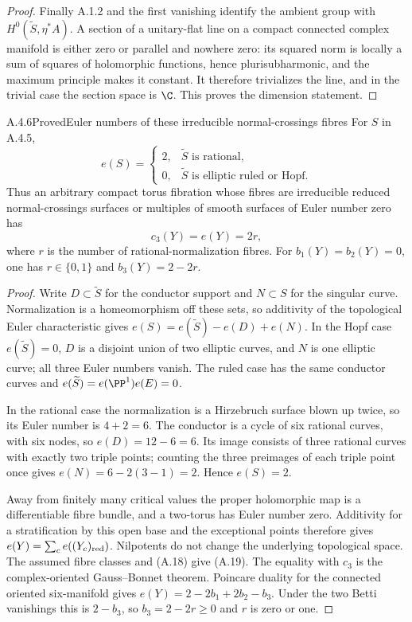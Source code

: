 \begin{proof}
Finally A.1.2 and the first vanishing identify the ambient group with $H^0(\widetilde S,\eta^*A)$. A section of a unitary-flat line on a compact connected complex manifold is either zero or parallel and nowhere zero: its squared norm is locally a sum of squares of holomorphic functions, hence plurisubharmonic, and the maximum principle makes it constant. It therefore trivializes the line, and in the trivial case the section space is $\C$. This proves the dimension statement.
\end{proof}

\begin{statement}{A.4.6}{Proved}{Euler numbers of these irreducible normal-crossings fibres}
For $S$ in A.4.5,
\[
e(S)=\begin{cases}
2,&\widetilde S\text{ is rational},\\
0,&\widetilde S\text{ is elliptic ruled or Hopf}.
\end{cases}
\tag{A.18}
\]
Thus an arbitrary compact torus fibration whose fibres are irreducible reduced normal-crossings surfaces or multiples of smooth surfaces of Euler number zero has
\[
c_3(Y)=e(Y)=2r,
\tag{A.19}
\]
where $r$ is the number of rational-normalization fibres. For $b_1(Y)=b_2(Y)=0$, one has $r\in\{0,1\}$ and $b_3(Y)=2-2r$.
\end{statement}
\begin{proof}
Write $D\subset\widetilde S$ for the conductor support and $N\subset S$ for the singular curve. Normalization is a homeomorphism off these sets, so additivity of the topological Euler characteristic gives $e(S)=e(\widetilde S)-e(D)+e(N)$. In the Hopf case $e(\widetilde S)=0$, $D$ is a disjoint union of two elliptic curves, and $N$ is one elliptic curve; all three Euler numbers vanish. The ruled case has the same conductor curves and $e(\widetilde S)=e(\PP^1)e(E)=0$.

In the rational case the normalization is a Hirzebruch surface blown up twice, so its Euler number is $4+2=6$. The conductor is a cycle of six rational curves, with six nodes, so $e(D)=12-6=6$. Its image consists of three rational curves with exactly two triple points; counting the three preimages of each triple point once gives $e(N)=6-2(3-1)=2$. Hence $e(S)=2$.

Away from finitely many critical values the proper holomorphic map is a differentiable fibre bundle, and a two-torus has Euler number zero. Additivity for a stratification by this open base and the exceptional points therefore gives $e(Y)=\sum_c e((Y_c)_{\rm red})$. Nilpotents do not change the underlying topological space. The assumed fibre classes and (A.18) give (A.19). The equality with $c_3$ is the complex-oriented Gauss--Bonnet theorem. Poincare duality for the connected oriented six-manifold gives $e(Y)=2-2b_1+2b_2-b_3$. Under the two Betti vanishings this is $2-b_3$, so $b_3=2-2r\ge0$ and $r$ is zero or one.
\end{proof}

